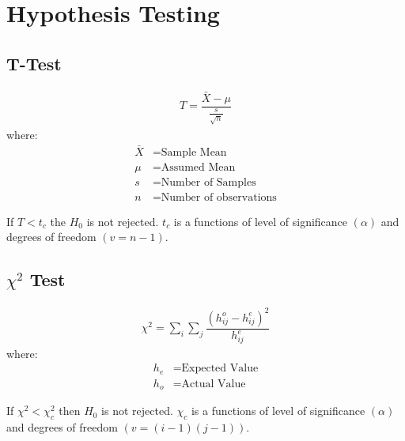 \documentclass[../main.tex]{subfile}
\begin{document}
    \chapter{Hypothesis Testing}
    \section{T-Test}
    \begin{align}
        T = \dfrac{\bar{X}-\mu}{\frac{s}{\sqrt{n}}}
    \end{align}
    where:
    \begin{align*}
        \bar{X} &= \text{Sample Mean}\\
        \mu &= \text{Assumed Mean}\\
        s &= \text{Number of Samples}\\
        n &= \text{Number of observations}
    \end{align*}

    If $T < t_c$ the $H_0$ is not rejected. $t_c$ is a functions of level of significance $(\alpha)$ and degrees of freedom $(v = n -1)$.

    \section{$\chi^2$ Test}
    \begin{align}
        \chi^2 = \sum_i \sum_j \dfrac{(h_{ij}^o-h_{ij}^e)^2}{h_{ij}^e}
    \end{align}
    where:
    \begin{align*}
        h_e &= \text{Expected Value}\\
        h_o &= \text{Actual Value}
    \end{align*}

    If $\chi^2 < \chi_c^2$ then $H_0$ is not rejected. $\chi_c$ is a functions of level of significance $(\alpha)$ and degrees of freedom $(v = (i-1)(j-1))$.
\end{document}

